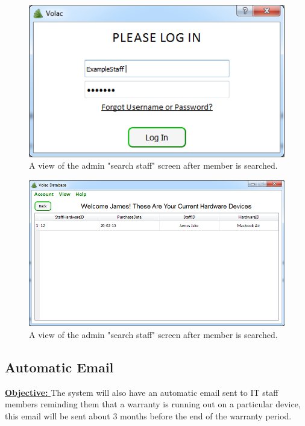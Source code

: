 \begin{figure}[H]
    \includegraphics[width=\textwidth]{./Evaluation/Images/login4.png}
    \caption{A view of the admin "search staff" screen after member is searched.} 
\end{figure}

\begin{figure}[H]
    \includegraphics[width=\textwidth]{./Evaluation/Images/login5.png}
    \caption{A view of the admin "search staff" screen after member is searched.} 
\end{figure}



\subsection{Automatic Email}

\underline{\textbf{Objective:} } The system will also have an automatic email sent to IT staff members reminding them that a warranty is running out on a particular device, this email will be sent about 3 months before the end of the warranty period.


